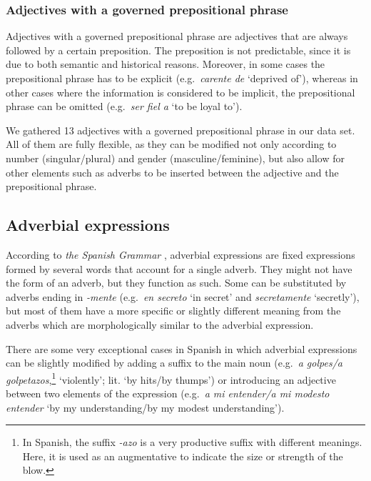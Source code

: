 \documentclass[output=paper]{langsci/langscibook}
\begin{document}
\subsubsection{Adjectives with a governed prepositional phrase}
\label{ssssec:adjs_with_PP}

Adjectives with a governed prepositional phrase are adjectives that are always followed by a certain preposition.
The preposition is not predictable, since it is due to both semantic and historical reasons.
Moreover, in some cases the prepositional phrase has to be explicit (e.g.\ \textit{carente de} `deprived of'), whereas in other cases where the information is considered to be implicit, the prepositional phrase can be omitted (e.g.\ \textit{ser fiel a} `to be loyal to').

We gathered 13 adjectives with a governed prepositional phrase in our data set.
All of them are fully flexible, as they can be modified not only according to number (singular/plural) and gender (masculine/feminine), but also allow for other elements such as adverbs to be inserted between the adjective and the prepositional phrase.


\subsection{Adverbial expressions}
\label{sssec:adverbialExps}

According to \textit{the Spanish Grammar} \citeyearpar[599]{RAE:2010}, adverbial expressions are fixed expressions 
formed by several words that account for a single adverb.
They might not have the form of an adverb, but they function as such.
Some can be substituted by adverbs ending in \textit{-mente} (e.g.\ \textit{en secreto} `in secret' and \textit{secretamente} `secretly'), but most of them have a more specific or slightly different meaning from the adverbs which are morphologically similar to the adverbial expression.

There are some very exceptional cases in Spanish in which adverbial expressions can be slightly modified \citep[600]{RAE:2010} by adding a suffix to the main noun (e.g.\ \textit{a golpes/a golpetazos},\footnote{In Spanish, the suffix \textit{-azo} is a very productive suffix with different meanings. Here, it is used as an augmentative to indicate the size or strength of the blow.} `violently'; lit. `by hits/by thumps') or introducing an adjective between two elements of the expression (e.g.\ \textit{a mi entender/a mi modesto entender} `by my understanding/by my modest understanding').
\end{document}
